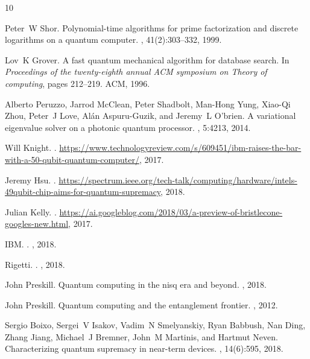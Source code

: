 \documentclass[journal,10pt,twocolumn]{IEEEtran}
\begin{document}
%
%
\begin{thebibliography}{10}

Peter~W Shor.
\newblock Polynomial-time algorithms for prime factorization and discrete
  logarithms on a quantum computer.
, 41(2):303--332, 1999.

Lov~K Grover.
\newblock A fast quantum mechanical algorithm for database search.
\newblock In {\em Proceedings of the twenty-eighth annual ACM symposium on
  Theory of computing}, pages 212--219. ACM, 1996.

Alberto Peruzzo, Jarrod McClean, Peter Shadbolt, Man-Hong Yung, Xiao-Qi Zhou,
  Peter~J Love, Al{\'a}n Aspuru-Guzik, and Jeremy~L O’brien.
\newblock A variational eigenvalue solver on a photonic quantum processor.
, 5:4213, 2014.

{Will Knight}.
.
\newblock
  {\url{https://www.technologyreview.com/s/609451/ibm-raises-the-bar-with-a-50-qubit-quantum-computer/},
  2017}.

{Jeremy Hsu}.
.
\newblock
  {\url{https://spectrum.ieee.org/tech-talk/computing/hardware/intels-49qubit-chip-aims-for-quantum-supremacy},
  2018}.

{Julian Kelly}.
.
\newblock
  {\url{https://ai.googleblog.com/2018/03/a-preview-of-bristlecone-googles-new.html}},
  2017.

{IBM}.
.
, 2018.

{Rigetti}.
.
, 2018.

John Preskill.
\newblock Quantum computing in the nisq era and beyond.
, 2018.

John Preskill.
\newblock Quantum computing and the entanglement frontier.
, 2012.

Sergio Boixo, Sergei~V Isakov, Vadim~N Smelyanskiy, Ryan Babbush, Nan Ding,
  Zhang Jiang, Michael~J Bremner, John~M Martinis, and Hartmut Neven.
\newblock Characterizing quantum supremacy in near-term devices.
, 14(6):595, 2018.


\end{thebibliography}
\end{document}
